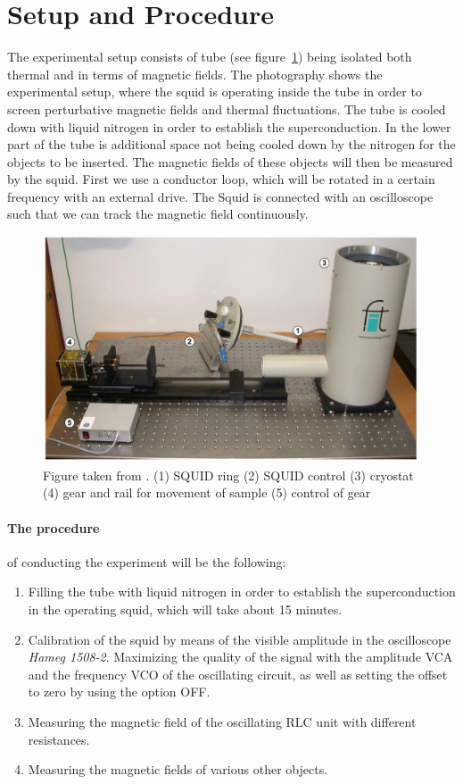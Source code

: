 \section{Setup and Procedure}
The experimental setup consists of tube (see figure~\ref{fig:setup1}) being
isolated both thermal and in terms of magnetic fields. 
The photography shows the experimental setup, where the squid is operating inside the tube in order
    to screen perturbative magnetic fields and thermal fluctuations. The tube is cooled down
    with liquid nitrogen in order to establish the superconduction. In the lower part of the
    tube is additional space not being cooled down by the nitrogen for the objects to be inserted.
    The magnetic fields of these objects will then be measured by the squid.
First we use a conductor loop, which will be rotated in a certain frequency with
an external drive. The Squid is connected with an oscilloscope such that 
we can track the magnetic field continuously.
\begin{figure}[htpb]
    \centering
    \includegraphics[width=0.8\linewidth]{figures/setup_fig}
    \caption{Figure taken from \cite{ver}. (1) SQUID ring (2) SQUID control (3) cryostat (4) gear and 
    rail for movement of sample (5) control of gear}
    \label{fig:setup1}
\end{figure}
\paragraph{The procedure} of conducting the experiment will be
the following:
\begin{enumerate}
\item Filling the tube with liquid nitrogen in order to establish the superconduction in the
operating squid, which will take about 15 minutes.
\item Calibration of the squid by means of the visible amplitude in the oscilloscope \textit{Hameg 1508-2}.
Maximizing the quality of the signal with the amplitude VCA and the frequency VCO of the oscillating circuit, as
well as setting the offset to zero by using the option OFF.
\item Measuring the magnetic field of the oscillating RLC unit with different resistances.
\item Measuring the magnetic fields of various other objects.
\end{enumerate}


